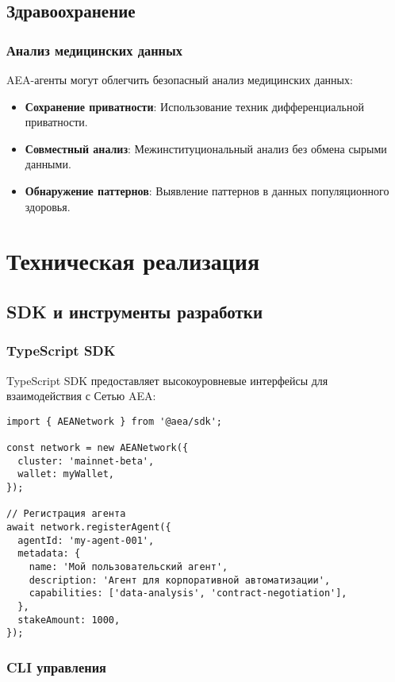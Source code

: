 \documentclass[12pt,a4paper]{article}
\begin{document}
\subsection{Здравоохранение}

\subsubsection{Анализ медицинских данных}

AEA-агенты могут облегчить безопасный анализ медицинских данных:

\begin{itemize}
\item \textbf{Сохранение приватности}: Использование техник дифференциальной приватности.
\item \textbf{Совместный анализ}: Межинституциональный анализ без обмена сырыми данными.
\item \textbf{Обнаружение паттернов}: Выявление паттернов в данных популяционного здоровья.
\end{itemize}

\section{Техническая реализация}

\subsection{SDK и инструменты разработки}

\subsubsection{TypeScript SDK}

TypeScript SDK предоставляет высокоуровневые интерфейсы для взаимодействия с Сетью AEA:

\begin{verbatim}
import { AEANetwork } from '@aea/sdk';

const network = new AEANetwork({
  cluster: 'mainnet-beta',
  wallet: myWallet,
});

// Регистрация агента
await network.registerAgent({
  agentId: 'my-agent-001',
  metadata: {
    name: 'Мой пользовательский агент',
    description: 'Агент для корпоративной автоматизации',
    capabilities: ['data-analysis', 'contract-negotiation'],
  },
  stakeAmount: 1000,
});
\end{verbatim}

\subsubsection{CLI управления}
\end{document}
